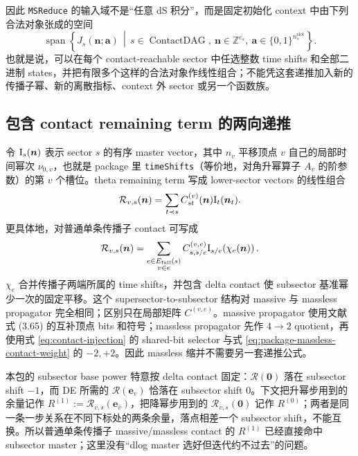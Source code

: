 \documentclass[11pt,a4paper]{ctexart}
\newcommand{\cR}{\mathcal R}
\begin{document}
因此 \texttt{MSReduce} 的输入域不是“任意 dS 积分”，而是固定初始化 context 中由下列合法对象张成的空间
\begin{equation}
 \boxed{
 \operatorname{span}\!\left\{
 J_s(\bm n;\bm a)\,\middle|\,
 s\in\operatorname{ContactDAG},\
 \bm n\in\mathbb Z^{c_s},\
 \bm a\in\{0,1\}^{n_s^{\mathrm{slot}}}
 \right\}.
 }
 \label{eq:MSReduce-domain}
\end{equation}
也就是说，可以在每个 contact-reachable sector 中任选整数 time shifts 和全部二进制 states，并把有限多个这样的合法对象作线性组合；不能凭这套递推加入新的传播子幂、新的离散指标、context 外 sector 或另一个函数族。

\subsection{包含 contact remaining term 的两向递推}

令 $\bm{\text I}_s(\bm n)$ 表示 sector $s$ 的有序 master vector，其中 $n_v$ 平移顶点 $v$ 自己的局部时间幂次 $\nu_{0,v}$，也就是 package 里 \texttt{timeShifts}（等价地，对角升幂算子 $A_v$ 的阶参数）的第 $v$ 个槽位。theta remaining term 写成 lower-sector vectors 的线性组合
\begin{equation}
 \cR_{v,s}(\bm n)
 =\sum_{t\prec s}C_{st}^{(v)}(\bm n)\bm{\text I}_t(\bm n_t).
 \label{eq:R-as-CF}
\end{equation}
更具体地，对普通单条传播子 contact 可写成
\begin{equation}
 \cR_{v,s}(\bm n)
 =\sum_{\substack{e\in E_{\rm full}(s)\\v\in e}}
 C_{s,s/e}^{(v,e)}
 \bm{\text I}_{s/e}\!\left(\chi_e(\bm n)\right).
 \label{eq:R-edge-sum}
\end{equation}
$\chi_e$ 合并传播子两端所属的 time shifts，并包含 delta contact 使 subsector 基准幂少一次的固定平移。这个 supersector-to-subsector 结构对 massive 与 massless propagator 完全相同；区别只在局部矩阵 $C^{(v,e)}$。massive propagator 使用文献 \cite{Chen:2023eic} 式 (3.65) 的互补顶点 bits 和符号；massless propagator 先作 $4\to2$ quotient，再使用式 \eqref{eq:contact-injection} 的 shared-bit selector 与式 \eqref{eq:package-massless-contact-weight} 的 $-2,+2$。因此 massless 缩并不需要另一套递推公式。

本包的 subsector base power 特意按 delta contact 固定：$\cR(\bm0)$ 落在 subsector shift $-1$，而 DE 所需的 $\cR(\bm e_v)$ 恰落在 subsector shift $0$。下文把升幂步用到的余量记作 $R^{(1)}:=\cR_{v,s}(\bm e_v)$，把降幂步用到的 $\cR_{v,s}(\bm0)$ 记作 $R^{(0)}$；两者是同一条一步关系在不同下标处的两条余量，落点相差一个 subsector shift，不能互换。所以普通单条传播子 massive/massless contact 的 $R^{(1)}$ 已经直接命中 subsector master；这里没有“dlog master 选好但迭代约不过去”的问题。
\end{document}
